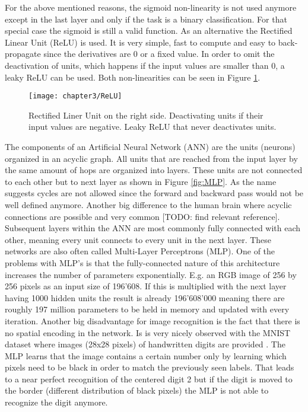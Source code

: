 For the above mentioned reasons, the sigmoid non-linearity is not used anymore except in the last layer and only if the task is a binary classification. For that special case the sigmoid is still a valid function. As an alternative the Rectified Linear Unit (ReLU) is used. It is very simple, fast to compute and easy to back-propagate since the derivatives are 0 or a fixed value. In order to omit the deactivation of units, which happens if the input values are smaller than 0, a leaky ReLU can be used. Both non-linearities can be seen in Figure \ref{fig:ReLU}.

\begin{figure}[H]
  \centering
  \caption{Rectified Liner Unit on the right side. Deactivating units if their input values are negative. Leaky ReLU that never deactivates units. \cite{reinventingNN}}
  \texttt{[image: chapter3/ReLU]}
  \label{fig:ReLU}
\end{figure}

The components of an Artificial Neural Network (ANN) are the units (neurons) organized in an acyclic graph. All units that are reached from the input layer by the same amount of hops are organized into layers. These units are not connected to each other but to next layer as shown in Figure \ref{fig:MLP}. As the name suggests cycles are not allowed since the forward and backward pass would not be well defined anymore. Another big difference to the human brain where acyclic connections are possible and very common [TODO: find relevant reference]. Subsequent layers within the ANN are most commonly fully connected with each other, meaning every unit connects to every unit in the next layer. These networks are also often called Multi-Layer Perceptrons (MLP). One of the problems with MLP's is that the fully-connected nature of this architecture increases the number of parameters exponentially. E.g. an RGB image of 256 by 256 pixels as an input size of 196'608. If this is multiplied with the next layer having 1000 hidden units the result is already 196'608'000 meaning there are roughly 197 million parameters to be held in memory and updated with every iteration. Another big disadvantage for image recognition is the fact that there is no spatial encoding in the network. Is is very nicely observed with the MNIST dataset where images (28x28 pixels) of handwritten digits are provided \cite{MNISTdatabase}. The MLP learns that the image contains a certain number only by learning which pixels need to be black in order to match the previously seen labels. That leads to a near perfect recognition of the centered digit 2 but if the digit is moved to the border (different distribution of black pixels) the MLP is not able to recognize the digit anymore.


